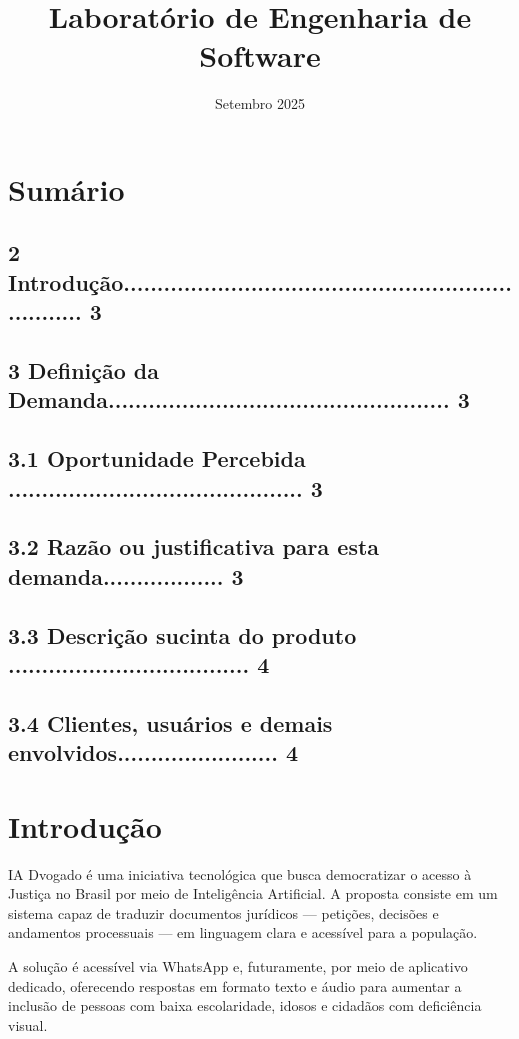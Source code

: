 \documentclass{article}
\title{Laboratório de Engenharia de Software}
\date{Setembro 2025}
\begin{document}
\maketitle
\newpage

\section{Sumário}
\subsection* {2 Introdução..................................................................... 3}
\subsection* {3   Definição da Demanda................................................... 3}
\subsection* {3.1 Oportunidade Percebida ............................................ 3}
\subsection* {3.2 Razão ou justificativa para esta demanda.................. 3}
\subsection* {3.3 Descrição sucinta do produto .................................... 4}
\subsection* {3.4 Clientes, usuários e demais envolvidos........................ 4}
\newpage

\section{Introdução}
IA Dvogado é uma iniciativa tecnológica que busca democratizar o acesso à Justiça no Brasil por meio de Inteligência Artificial. A proposta consiste em um sistema capaz de traduzir documentos jurídicos — petições, decisões e andamentos processuais — em linguagem clara e acessível para a população.

A solução é acessível via WhatsApp e, futuramente, por meio de aplicativo dedicado, oferecendo respostas em formato texto e áudio para aumentar a inclusão de pessoas com baixa escolaridade, idosos e cidadãos com deficiência visual.
\end{document}
